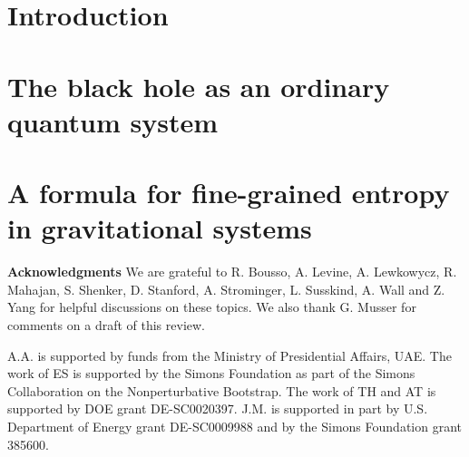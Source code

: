 \documentclass[11pt,oneside,letterpaper]{article}
\numberwithin{equation}{section}
\begin{document}
    
  \begin{spacing}{1.15}

\section{Introduction}




 

\section{The black hole as an ordinary quantum system} \label{central}


 


\section{A formula for fine-grained entropy in gravitational systems}\label{finegrain}


 


 

 









\vspace{1cm}
\textbf{Acknowledgments} We are grateful to R. Bousso, A. Levine, A. Lewkowycz, R. Mahajan, S. Shenker, D. Stanford, A. Strominger, L. Susskind, A. Wall   and 
 Z. Yang 
for helpful discussions on these topics. We also thank G. Musser for comments on a draft of this review.
 
A.A. is supported by funds from the Ministry of Presidential Affairs, UAE. The work of ES is supported by the Simons Foundation as part of the Simons Collaboration on the Nonperturbative Bootstrap. The work of TH and AT is supported by DOE grant DE-SC0020397.
J.M. is supported in part by U.S. Department of Energy grant DE-SC0009988 and by the Simons Foundation grant 385600.

  \appendix
  
  
  \end{spacing}
\small

 
\end{document}
